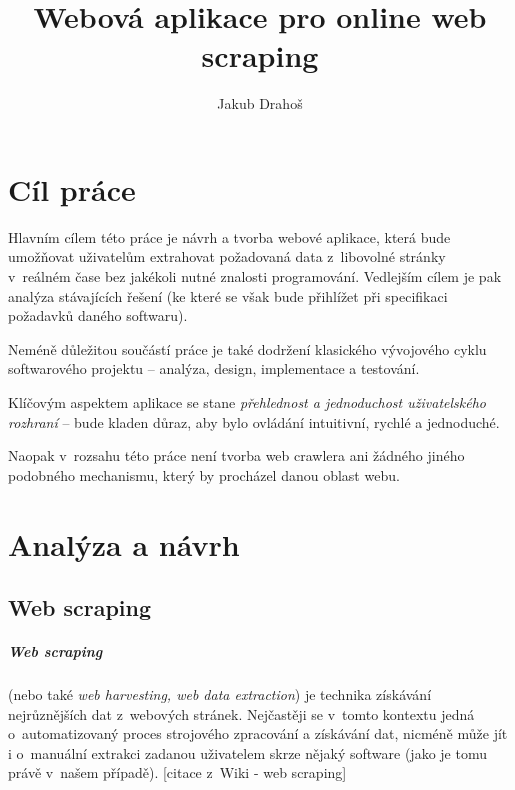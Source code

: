 \documentclass[thesis=B,czech]{FITthesis}[2012/06/26]
\title{Webová aplikace pro online web scraping}
\author{Jakub Drahoš} %
\begin{document}

\begin{introduction}
\end{introduction}





\chapter{Cíl práce}

Hlavním cílem této práce je návrh a tvorba webové aplikace, která bude umožňovat uživatelům extrahovat požadovaná data z~libovolné stránky v~reálném čase bez jakékoli nutné znalosti programování. Vedlejším cílem je pak analýza stávajících řešení (ke které se však bude přihlížet při specifikaci požadavků daného softwaru).

Neméně důležitou součástí práce je také dodržení klasického vývojového cyklu softwarového projektu -- analýza, design, implementace a testování.

Klíčovým aspektem aplikace se stane \emph{přehlednost a jednoduchost uživatelského rozhraní} -- bude kladen důraz, aby bylo ovládání intuitivní, rychlé a jednoduché.

Naopak v~rozsahu této práce není tvorba web crawlera ani žádného jiného podobného mechanismu, který by procházel danou oblast webu.




\chapter{Analýza a návrh}


\section{Web scraping}
\paragraph{Web scraping}
(nebo také \emph{web harvesting, web data extraction}) je technika získávání nejrůznějších dat z~webových stránek. Nejčastěji se v~tomto kontextu jedná o~automatizovaný proces strojového zpracování a získávání dat, nicméně může jít i o~manuální extrakci zadanou uživatelem skrze nějaký software (jako je tomu právě v~našem případě). [citace z~Wiki - web scraping]
\end{document}
